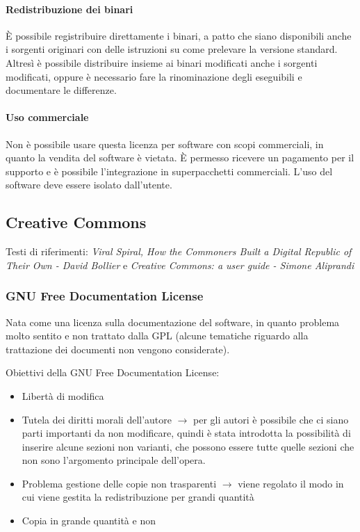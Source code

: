 \paragraph*{Redistribuzione dei binari}\`E possibile registribuire direttamente i binari, a patto che siano disponibili anche i sorgenti originari con delle istruzioni su come prelevare la versione standard. Altres\`i \`e possibile distribuire insieme ai binari modificati anche i sorgenti modificati, oppure \`e necessario fare la rinominazione degli eseguibili e documentare le differenze.

\paragraph*{Uso commerciale}Non \`e possibile usare questa licenza per software con scopi commerciali, in quanto la vendita del software \`e vietata. \`E permesso ricevere un pagamento per il supporto e \`e possibile l'integrazione in superpacchetti commerciali. L'uso del software deve essere isolato dall'utente.

\subsection{Creative Commons}

Testi di riferimenti: \textit{Viral Spiral, How the Commoners Built a Digital Republic of Their Own - David Bollier} e \textit{Creative Commons: a user guide - Simone Aliprandi}

\subsubsection{GNU Free Documentation License}

Nata come una licenza sulla documentazione del software, in quanto problema molto sentito e non trattato dalla GPL (alcune tematiche riguardo alla trattazione dei documenti non vengono considerate).

Obiettivi della GNU Free Documentation License:
\begin{itemize}

\item Libert\`a di modifica
\item Tutela dei diritti morali dell'autore $\to$ per gli autori \`e possibile che ci siano parti importanti da non modificare, quindi \`e stata introdotta la possibilit\`a di inserire alcune sezioni non varianti, che possono essere tutte quelle sezioni che non sono l'argomento principale dell'opera.
\item Problema gestione delle copie non trasparenti $\to$ viene regolato il modo in cui viene gestita la redistribuzione per grandi quantit\`a 
\item Copia in grande quantit\`a e non

\end{itemize} 

